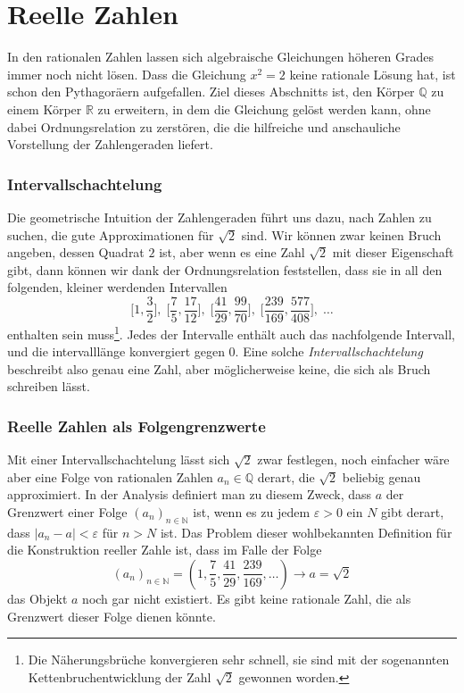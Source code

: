 %
%
%
\section{Reelle Zahlen
\label{buch:section:reelle-zahlen}}
In den rationalen Zahlen lassen sich algebraische Gleichungen höheren
Grades immer noch nicht lösen.
Dass die Gleichung $x^2=2$ keine rationale Lösung hat, ist schon den
Pythagoräern aufgefallen.
Ziel dieses Abschnitts ist, den Körper $\mathbb{Q}$ zu einem
Körper $\mathbb{R}$ zu erweitern, in dem die Gleichung
gelöst werden kann, ohne dabei Ordnungsrelation zu zerstören, die
die hilfreiche und anschauliche Vorstellung der Zahlengeraden
liefert.
%

\subsubsection{Intervallschachtelung}
Die geometrische Intuition der Zahlengeraden führt uns dazu, nach
Zahlen zu suchen, die gute Approximationen für $\sqrt{2}$ sind.
Wir können zwar keinen Bruch angeben, dessen Quadrat $2$ ist, aber
wenn es eine Zahl $\sqrt{2}$ mit dieser Eigenschaft gibt, dann können
wir dank der Ordnungsrelation feststellen, dass sie in all den folgenden,
kleiner werdenden Intervallen
\[
\biggl[1,\frac32\biggr],\;
\biggl[\frac75,\frac{17}{12}\biggr],\;
\biggl[\frac{41}{29},\frac{99}{70}\biggr],\;
\biggl[\frac{239}{169},\frac{577}{408}\biggr],\;
\dots
\]
enthalten sein muss\footnote{Die Näherungsbrüche konvergieren sehr
schnell, sie sind mit der sogenannten Kettenbruchentwicklung der
Zahl $\sqrt{2}$ gewonnen worden.}.
Jedes der Intervalle enthält auch das nachfolgende Intervall, und
die intervalllänge konvergiert gegen 0.
Eine solche \emph{Intervallschachtelung} beschreibt also genau eine Zahl,
%
aber möglicherweise keine, die sich als Bruch schreiben lässt.

\subsubsection{Reelle Zahlen als Folgengrenzwerte}
Mit einer Intervallschachtelung lässt sich $\sqrt{2}$ zwar festlegen,
noch einfacher wäre aber eine Folge von rationalen Zahlen $a_n\in\mathbb{Q}$
derart, die $\sqrt{2}$ beliebig genau approximiert.
In der Analysis definiert man zu diesem Zweck, dass $a$ der Grenzwert
einer Folge $(a_n)_{n\in\mathbb{N}}$ ist, wenn es zu jedem $\varepsilon > 0$
ein $N$ gibt derart, dass $|a_n-a|<\varepsilon$ für $n>N$ ist.
Das Problem dieser wohlbekannten Definition für die Konstruktion
reeller Zahle ist, dass im Falle der Folge
\[
(a_n)_{n\in\mathbb{N}}=
(1,
\frac75,
\frac{41}{29},
\frac{239}{169},\dots) \to a=\sqrt{2}
\]
das Objekt $a$ noch gar nicht existiert.
Es gibt keine rationale Zahl, die als Grenzwert dieser Folge dienen
könnte.

